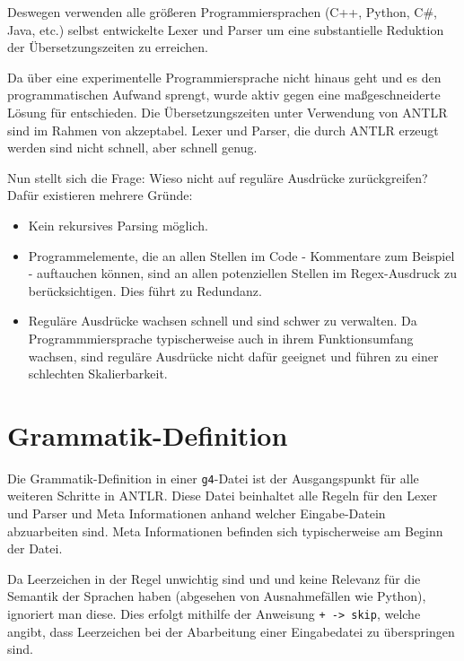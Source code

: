 Deswegen verwenden alle größeren Programmiersprachen (C++, Python, C\#, Java, etc.) selbst entwickelte Lexer und Parser um eine substantielle Reduktion der Übersetzungszeiten zu erreichen.

Da \toya über eine experimentelle Programmiersprache nicht hinaus geht und es den programmatischen Aufwand sprengt, wurde aktiv gegen eine maßgeschneiderte Lösung für \toya entschieden. Die Übersetzungszeiten unter Verwendung von ANTLR sind im Rahmen von \toya akzeptabel. Lexer und Parser, die durch ANTLR erzeugt werden sind nicht schnell, aber schnell genug.

Nun stellt sich die Frage: Wieso nicht auf reguläre Ausdrücke zurückgreifen? Dafür existieren mehrere Gründe:
\begin{itemize}
    \item Kein rekursives Parsing möglich.
    \item Programmelemente, die an allen Stellen im Code - Kommentare zum Beispiel - auftauchen können, sind an allen potenziellen Stellen im Regex-Ausdruck zu berücksichtigen. Dies führt zu Redundanz.
    \item Reguläre Ausdrücke wachsen schnell und sind schwer zu verwalten. Da Programmmiersprache typischerweise auch in ihrem Funktionsumfang wachsen, sind reguläre Ausdrücke nicht dafür geeignet und führen zu einer schlechten Skalierbarkeit.
\end{itemize}


\section{Grammatik-Definition}

Die Grammatik-Definition in einer \texttt{g4}-Datei ist der Ausgangspunkt für alle weiteren Schritte in ANTLR. Diese Datei beinhaltet alle Regeln für den Lexer und Parser und Meta Informationen anhand welcher Eingabe-Datein abzuarbeiten sind. Meta Informationen befinden sich typischerweise am Beginn der Datei.

Da Leerzeichen in der Regel unwichtig sind und und keine Relevanz für die Semantik der Sprachen haben (abgesehen von Ausnahmefällen wie Python), ignoriert man diese. Dies erfolgt mithilfe der Anweisung \texttt{+ -> skip}, welche angibt, dass Leerzeichen bei der Abarbeitung einer Eingabedatei zu überspringen sind.

